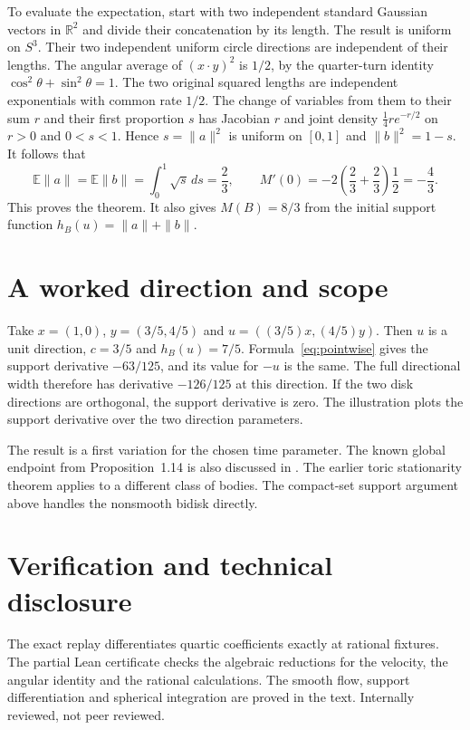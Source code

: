 \documentclass[11pt,a4paper]{amsart}
\newcommand{\R}{\mathbb R}
\newcommand{\E}{\mathbb E}
\begin{document}
To evaluate the expectation, start with two independent standard Gaussian vectors in $\R^2$ and divide their concatenation by its length. The result is uniform on $S^3$. Their two independent uniform circle directions are independent of their lengths. The angular average of $(x\cdot y)^2$ is $1/2$, by the quarter-turn identity $\cos^2\theta+\sin^2\theta=1$. The two original squared lengths are independent exponentials with common rate $1/2$. The change of variables from them to their sum $r$ and their first proportion $s$ has Jacobian $r$ and joint density $\tfrac14 r e^{-r/2}$ on $r>0$ and $0<s<1$. Hence $s=\|a\|^2$ is uniform on $[0,1]$ and $\|b\|^2=1-s$. It follows that
\[
 \E\|a\|=\E\|b\|=\int_0^1\sqrt{s}\,ds=\frac23,\qquad
 M'(0)=-2\left(\frac23+\frac23\right)\frac12=-\frac43 .
\]
This proves the theorem. It also gives $M(B)=8/3$ from the initial support function $h_B(u)=\|a\|+\|b\|$.

\section{A worked direction and scope}
Take $x=(1,0)$, $y=(3/5,4/5)$ and $u=((3/5)x,(4/5)y)$. Then $u$ is a unit direction, $c=3/5$ and $h_B(u)=7/5$. Formula~\eqref{eq:pointwise} gives the support derivative $-63/125$, and its value for $-u$ is the same. The full directional width therefore has derivative $-126/125$ at this direction. If the two disk directions are orthogonal, the support derivative is zero. The illustration plots the support derivative over the two direction parameters.

The result is a first variation for the chosen time parameter. The known global endpoint from Proposition~1.14 is also discussed in \cite[after Proposition~3.7]{capacity}. The earlier toric stationarity theorem \cite[Theorem~1.3]{variations} applies to a different class of bodies. The compact-set support argument above handles the nonsmooth bidisk directly.

\section*{Verification and technical disclosure}
The exact replay differentiates quartic coefficients exactly at rational fixtures. The partial Lean certificate checks the algebraic reductions for the velocity, the angular identity and the rational calculations. The smooth flow, support differentiation and spherical integration are proved in the text. Internally reviewed, not peer reviewed.
\end{document}
